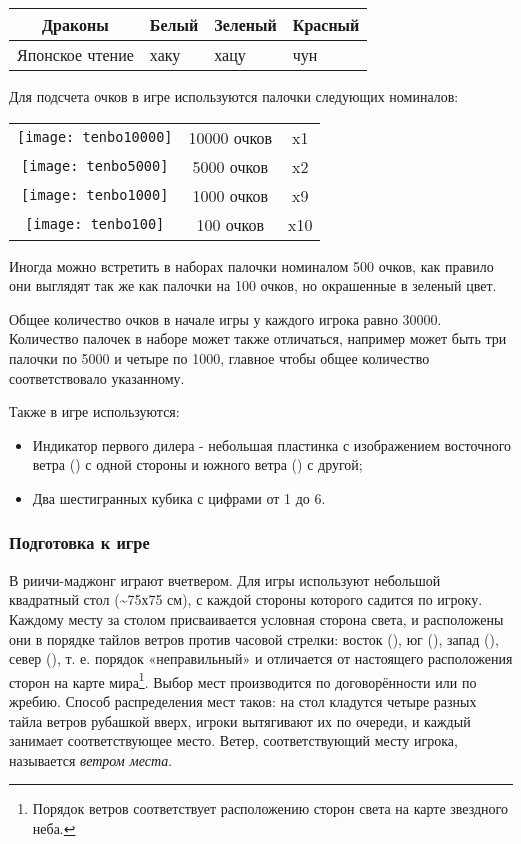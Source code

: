 \begin{tabular}{ |c|C{2cm}|C{2cm}|C{2cm}| } 
	\hline
	 \rule[0ex]{0pt}{7ex} Драконы &  \newline Белый &  \newline Зеленый &  \newline Красный \\
	\hline
	Японское чтение & хаку & хацу & чун \\
	\hline
\end{tabular}

Для подсчета очков в игре используются палочки следующих номиналов:

\begin{tabular}{ |c|c|c| } 
	\hline
	\texttt{[image: tenbo10000]} & 10000 очков & x1 \\
	\texttt{[image: tenbo5000]} & 5000 очков & x2 \\
	\texttt{[image: tenbo1000]} & 1000 очков & x9 \\
	\texttt{[image: tenbo100]} & 100 очков & x10 \\
	\hline
\end{tabular}

Иногда можно встретить в наборах палочки номиналом 500 очков, как правило они выглядят так же как палочки на 100 очков, но окрашенные в зеленый цвет.

Общее количество очков в начале игры у каждого игрока равно 30000. Количество палочек в наборе может также отличаться, например может быть три палочки по 5000 и четыре по 1000, главное чтобы общее количество соответствовало указанному.

Также в игре используются:
\begin{itemize}
	\item Индикатор первого дилера - небольшая пластинка с изображением восточного ветра () с одной стороны и южного ветра () с другой;
	\item Два шестигранных кубика с цифрами от 1 до 6.
\end{itemize}

\subsubsection{Подготовка к игре}

В риичи-маджонг играют вчетвером. Для игры используют небольшой квадратный стол (\sim75х75 см), с каждой стороны которого садится по игроку. Каждому месту за столом присваивается условная сторона света, и расположены они в порядке тайлов ветров против часовой стрелки: восток (), юг (), запад (), север (), т. е. порядок «неправильный» и отличается от настоящего расположения сторон на карте мира\footnote{Порядок ветров соответствует расположению сторон света на карте звездного неба.}. Выбор мест производится по договорённости или по жребию. Способ распределения мест таков: на стол кладутся четыре разных тайла ветров рубашкой вверх, игроки вытягивают их по очереди, и каждый занимает соответствующее место. Ветер, соответствующий месту игрока, называется \textit{ветром места}. 

